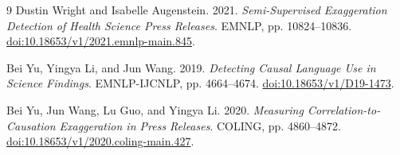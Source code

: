 \begin{thebibliography}{9}
Dustin Wright and Isabelle Augenstein. 2021.
\textit{Semi-Supervised Exaggeration Detection of Health Science Press Releases}.
EMNLP, pp. 10824--10836.
\href{https://aclanthology.org/2021.emnlp-main.845/}{doi:10.18653/v1/2021.emnlp-main.845}.

Bei Yu, Yingya Li, and Jun Wang. 2019.
\textit{Detecting Causal Language Use in Science Findings}.
EMNLP-IJCNLP, pp. 4664--4674.
\href{https://aclanthology.org/D19-1473/}{doi:10.18653/v1/D19-1473}.

Bei Yu, Jun Wang, Lu Guo, and Yingya Li. 2020.
\textit{Measuring Correlation-to-Causation Exaggeration in Press Releases}.
COLING, pp. 4860--4872.
\href{https://aclanthology.org/2020.coling-main.427/}{doi:10.18653/v1/2020.coling-main.427}.
\end{thebibliography}
